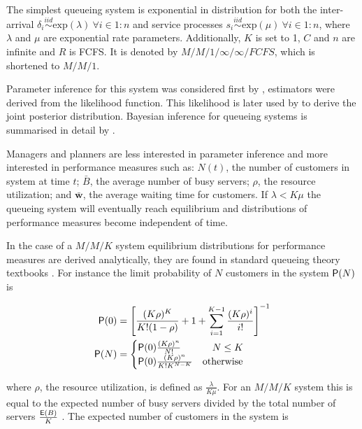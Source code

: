 \documentclass[article]{jss}
\begin{document}
The simplest queueing system is exponential in distribution for both the inter-arrival $\delta_i \overset{iid}{\sim} \mathrm{exp}(\lambda) ~ \forall i \in 1:n$ and service processes $s_i \overset{iid}{\sim} \mathrm{exp}(\mu) ~ \forall i \in 1:n$, where $\lambda$ and $\mu$ are exponential rate parameters. Additionally, $K$ is set to 1, $C$ and $n$ are infinite and $R$ is FCFS. It is denoted by $M/M/1/ \infty / \infty / FCFS$, which is shortened to $M/M/1$. 

Parameter inference for this system was considered first by \citet{clarke1957maximum}, estimators were derived from the likelihood function. This likelihood is later used by \citet{muddapur1972bayesian} to derive the joint posterior distribution. Bayesian inference for queueing systems is summarised in detail by \citet{insua2012bayesian}. 

Managers and planners are less interested in parameter inference and more interested in performance measures such as: $N(t)$, the number of customers in system at time $t$; $\bar{B}$, the average number of busy servers; $\rho$, the resource utilization; and $\bar{\mathbf{w}}$, the average waiting time for customers. If $\lambda < K \mu$ the queueing system will eventually reach equilibrium and distributions of performance measures become independent of time. 

In the case of a $M/M/K$ system equilibrium distributions for performance measures are derived analytically, they are found in standard queueing theory textbooks \citep{lipsky2008queueing, thomopoulos2012fundamentals}. For instance the limit probability of $N$ customers in the system $\mathsf{P}(N)$  is

\begin{align}
\mathsf{P}(0) &= \left[\frac{ (K \rho)^K}{K! (1 - \rho)} + 1 + \sum_{i=1}^{K-1} \frac{(K \rho)^i}{i!}   \right]^{-1} \\
\mathsf{P}(N) &= \begin{cases} 
\mathsf{P}(0) \frac{(K \rho)^n }{N!} & \quad  N \leq K\\
\mathsf{P}(0) \frac{(K \rho)^n }{K! K^{N-K}} & \text{otherwise}
\end{cases} \label{eq:pn}
\end{align}

where $\rho$, the resource utilization, is defined as $\frac{\lambda}{K \mu}$. For an $M/M/K$ system this is equal to the expected number of busy servers divided by the total number of servers $\frac{\mathsf{E}(B)}{K}$ \citep[pg. 451]{cassandras2009introduction}. The expected number of customers in the system is \citep{bhat2015introduction}  
\end{document}
